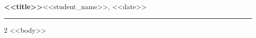 \documentclass[10pt,a4paper]{article}
\begin{document}
{\large\bfseries <<title>>}\hfill <<student_name>>, <<date>>
\hrule\medskip
\begin{multicols}{2}
<<body>>
\end{multicols}
\end{document}
